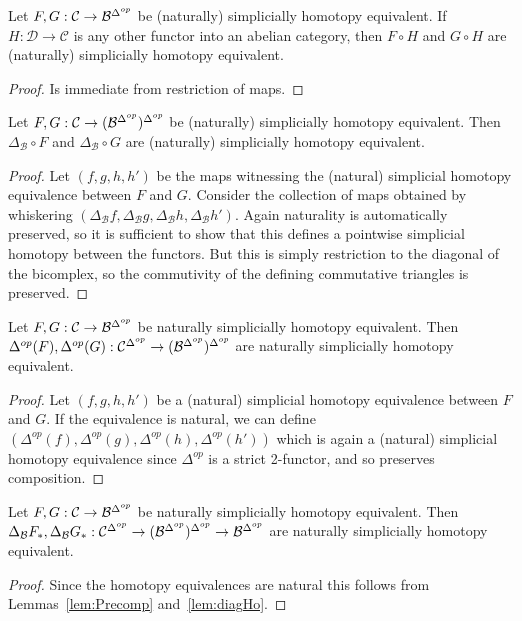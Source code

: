 \begin{lem}[label=lem:precompNat]
    Let $F,G: \mathcal{C}\rightarrow \mathcal{B}^{\Delta^{op}}$ be (naturally) simplicially homotopy equivalent. If $H:\mathcal{D}\rightarrow \mathcal{C}$ is any other functor into an abelian category, then $F\circ H$ and $G\circ H$ are (naturally) simplicially homotopy equivalent.
\end{lem}
\begin{proof}
    Is immediate from restriction of maps.
\end{proof}

\begin{lem}[label=lem:diagHo]
    Let $F,G: \mathcal{C}\rightarrow (\mathcal{B}^{\Delta^{op}})^{\Delta^{op}}$ be (naturally) simplicially homotopy equivalent. Then $\Delta_\mathcal{B}\circ F$ and $\Delta_\mathcal{B}\circ G$ are (naturally) simplicially homotopy equivalent.
\end{lem}
\begin{proof}
    Let $(f,g,h,h')$ be the maps witnessing the (natural) simplicial homotopy equivalence between $F$ and $G$. Consider the collection of maps obtained by whiskering $(\Delta_\mathcal{B}f,\Delta_\mathcal{B}g,\Delta_\mathcal{B}h,\Delta_\mathcal{B}h')$. Again naturality is automatically preserved, so it is sufficient to show that this defines a pointwise simplicial homotopy between the functors. But this is simply restriction to the diagonal of the bicomplex, so the commutivity of the defining commutative triangles is preserved.
\end{proof}


\begin{lem}[label=lem:Precomp]
    Let $F,G: \mathcal{C}\rightarrow \mathcal{B}^{\Delta^{op}}$ be naturally simplicially homotopy equivalent. Then $\Delta^{op}(F),\Delta^{op}(G): \mathcal{C}^{\Delta^{op}}\rightarrow (\mathcal{B}^{\Delta^{op}})^{\Delta^{op}}$ are naturally simplicially homotopy equivalent.
\end{lem}
\begin{proof}
    Let $(f,g,h,h')$ be a (natural) simplicial homotopy equivalence between $F$ and $G$. If the equivalence is natural, we can define $(\Delta^{op}(f),\Delta^{op}(g),\Delta^{op}(h),\Delta^{op}(h'))$ which is again a (natural) simplicial homotopy equivalence since $\Delta^{op}$ is a strict 2-functor, and so preserves composition.
\end{proof}


\begin{lem}[label=lem:PrecompDiag]
    Let $F,G: \mathcal{C}\rightarrow \mathcal{B}^{\Delta^{op}}$ be naturally simplicially homotopy equivalent. Then $\Delta_\mathcal{B}F_*,\Delta_\mathcal{B}G_*: \mathcal{C}^{\Delta^{op}}\rightarrow (\mathcal{B}^{\Delta^{op}})^{\Delta^{op}}\rightarrow \mathcal{B}^{\Delta^{op}}$ are naturally simplicially homotopy equivalent.
\end{lem}
\begin{proof}
    Since the homotopy equivalences are natural this follows from Lemmas~\ref{lem:Precomp} and~\ref{lem:diagHo}.
\end{proof}



